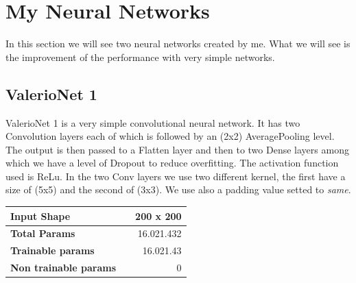 \documentclass[12pt]{article}
\begin{document}
\newpage
\section{My Neural Networks}
In this section we will see two neural networks created by me. What we will see is the improvement of the performance with very simple networks.
\subsection{ValerioNet 1}
ValerioNet 1 is a very simple convolutional neural network. It has two Convolution layers each of which is followed by an (2x2) AveragePooling level. The output is then passed to a Flatten layer and then to two Dense layers among which we have a level of Dropout to reduce overfitting. The activation function used is ReLu. In the two Conv layers we use two different kernel, the first have a size of (5x5) and the second of (3x3). We use also a padding value setted to {\em same}.

\bigskip
\begin{tabular}{|ll|r|}
  \hline
  {\bf Input Shape} & & 200 x 200         \\ \hline
  {\bf Total Params} & & 16.021.432       \\ \hline
  {\bf Trainable params} & & 16.021.43    \\ \hline
  {\bf Non trainable params} & & 0        \\ \hline
\end{tabular}
\end{document}
